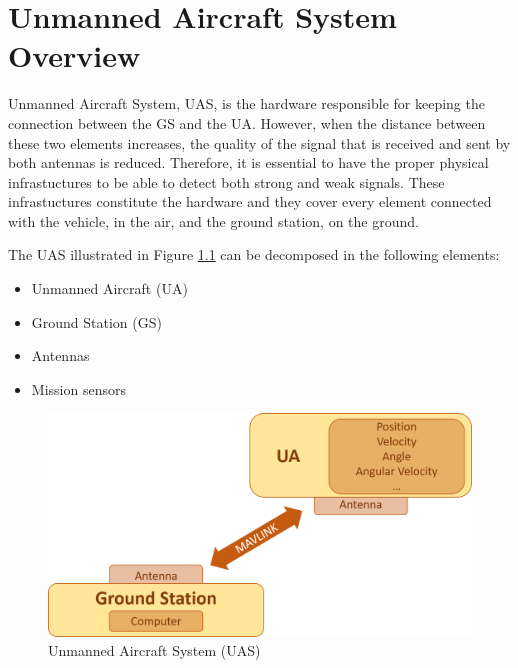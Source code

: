 \chapter{Unmanned Aircraft System Overview}\label{ch:uas}

Unmanned Aircraft System, UAS, is the hardware responsible for keeping the connection between the GS and the UA. However, when the distance between these two elements increases, the quality of the signal that is received and sent by both antennas is reduced. Therefore, it is essential to have the proper physical infrastuctures to be able to detect both strong and weak signals. These infrastuctures constitute the hardware and they cover every element connected with the vehicle, in the air, and the ground station, on the ground.


The UAS illustrated in Figure \ref{fig:uas} can be decomposed in the following elements:
\begin{itemize}
	\item Unmanned Aircraft (UA)
	\item Ground Station (GS)
	\item Antennas
	\item Mission sensors
\end{itemize}

\begin{figure}[H]
	\centering
	\includegraphics[scale=0.4]{figures/uas.png}
	\caption{Unmanned Aircraft System (UAS)}
	\label{fig:uas}
\end{figure}

